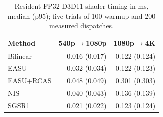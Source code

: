 \begin{table}[t]
\centering\small
\caption{Resident FP32 D3D11 shader timing in ms, median (p95); five trials of 100 warmup and 200 measured dispatches.}
\label{tab:external-runtime}
\begin{tabularx}{\columnwidth}{Yrr}
\toprule
Method & 540p$\to$1080p & 1080p$\to$4K\\
\midrule
Bilinear & 0.016 (0.017) & 0.122 (0.124)\\
EASU & 0.032 (0.034) & 0.122 (0.123)\\
EASU+RCAS & 0.048 (0.049) & 0.301 (0.303)\\
NIS & 0.040 (0.043) & 0.136 (0.139)\\
SGSR1 & 0.021 (0.022) & 0.123 (0.124)\\
\bottomrule
\end{tabularx}
\end{table}
